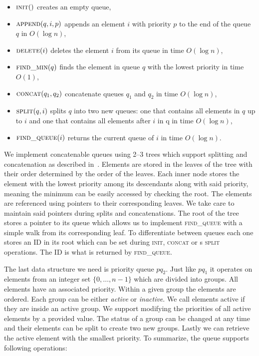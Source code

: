 \begin{itemize}
    \item $\textsc{init}()$ creates an empty queue,
    \item $\textsc{append}(q, i, p)$ appends an element $i$ with priority $p$ to the end of the queue $q$ in $O(\log n)$,
    \item $\textsc{delete}(i)$ deletes the element $i$ from its queue in time $O(\log n)$,
    \item $\textsc{find\_min}(q)$ finds the element in queue $q$ with the lowest priority in time $O(1)$,
    \item $\textsc{concat}(q_1, q_2)$ concatenate queues $q_1$ and $q_2$ in time $O(\log n)$,
    \item $\textsc{split}(q, i)$ splits $q$ into two new queues: one that contains all elements in $q$ up to $i$ and one that contains all elements after $i$ in q in time $O(\log n)$,
    \item $\textsc{find\_queue}(i)$ returns the current queue of $i$ in time $O(\log n)$.
\end{itemize}

We implement concatenable queues using 2–3 trees which support splitting and concatenation as described in~\cite{aho1974design}. Elements are stored in the leaves of the tree with their order determined by the order of the leaves. Each inner node stores the element with the lowest priority among its descendants along with said priority, meaning the minimum can be easily accessed by checking the root. The elements are referenced using pointers to their corresponding leaves. We take care to maintain said pointers during splits and concatenations. The root of the tree stores a pointer to its queue which allows us to implement \textsc{find\_queue} with a simple walk from its corresponding leaf. To differentiate between queues each one stores an ID in its root which can be set during \textsc{init}, \textsc{concat} or s \textsc{split} operations. The ID is what is returned by \textsc{find\_queue}.

The last data structure we need is priority queue $pq_2$. Just like $pq_1$ it operates on elements from an integer set $\{0, \dots, n-1\}$ which are divided into groups. All elements have an associated priority. Within a given group the elements are ordered. Each group can be either \textit{active} or \textit{inactive}. We call elements active if they are inside an active group. We support modifying the priorities of all active elements by a provided value. The status of a group can be changed at any time and their elements can be split to create two new groups. Lastly we can retrieve the active element with the smallest priority. To summarize, the queue supports following operations:

